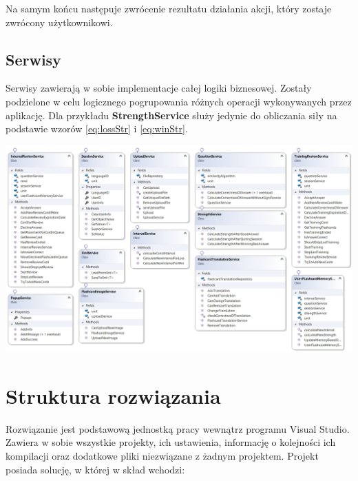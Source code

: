 Na samym końcu następuje zwrócenie rezultatu działania akcji, który zostaje zwrócony użytkownikowi.

\subsection{Serwisy}

Serwisy zawierają w sobie implementacje całej logiki biznesowej. Zostały podzielone w celu logicznego pogrupowania różnych operacji wykonywanych przez aplikację. Dla przykładu \textbf{StrengthService} służy jedynie do obliczania siły na podstawie wzorów \ref{eq:lossStr} i \ref{eq:winStr}.
\newpage

\begin{landscape}
\begin{center}
	\includegraphics[width=\paperwidth]{images/Serwisy.png}
\end{center}
\end{landscape}


\section{Struktura rozwiązania}

Rozwiązanie jest podstawową jednostką pracy wewnątrz programu Visual Studio. Zawiera w sobie wszystkie projekty, ich ustawienia, informację o kolejności ich kompilacji oraz dodatkowe pliki niezwiązane z żadnym projektem. Projekt posiada solucję, w której w skład wchodzi:

